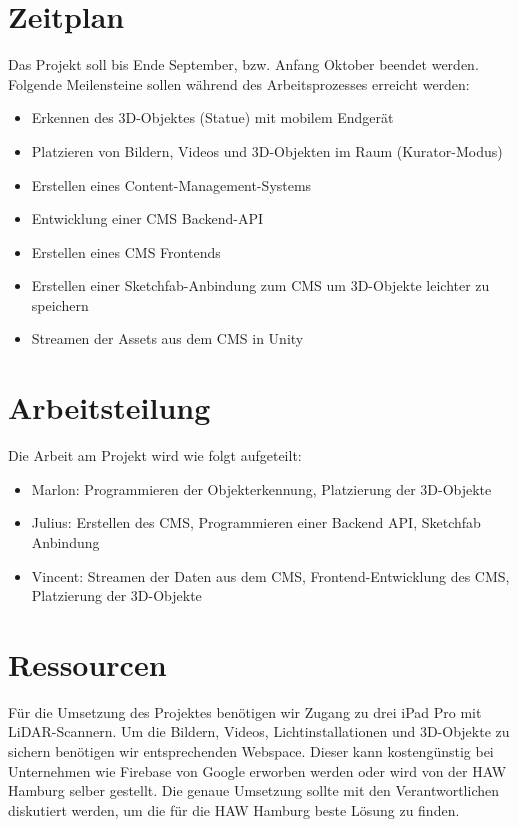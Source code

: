\documentclass[pdftex,10pt,a4paper,oneside]{article}
\numberwithin{equation}{section} %
\begin{document}
\section{Zeitplan}
Das Projekt soll bis Ende September, bzw. Anfang Oktober beendet werden. Folgende Meilensteine sollen während des Arbeitsprozesses erreicht werden:
\begin{itemize}
    \item Erkennen des 3D-Objektes (Statue) mit mobilem Endgerät
    \item Platzieren von Bildern, Videos und 3D-Objekten im Raum (Kurator-Modus)
    \item Erstellen eines Content-Management-Systems
    \item Entwicklung einer CMS Backend-API
    \item Erstellen eines CMS Frontends
    \item Erstellen einer Sketchfab-Anbindung zum CMS um 3D-Objekte leichter zu speichern
    \item Streamen der Assets aus dem CMS in Unity
\end{itemize}
\section{Arbeitsteilung}
Die Arbeit am Projekt wird wie folgt aufgeteilt:
\begin{itemize}
    \item Marlon: Programmieren der Objekterkennung, Platzierung der 3D-Objekte
    \item Julius: Erstellen des CMS, Programmieren einer Backend API, Sketchfab Anbindung
    \item Vincent: Streamen der Daten aus dem CMS, Frontend-Entwicklung des CMS, Platzierung der 3D-Objekte
\end{itemize}
\section{Ressourcen}
Für die Umsetzung des Projektes benötigen wir Zugang zu drei iPad Pro mit LiDAR-Scannern. Um die Bildern, Videos, Lichtinstallationen und 3D-Objekte zu sichern benötigen wir entsprechenden Webspace. Dieser kann kostengünstig bei Unternehmen wie Firebase von Google erworben werden oder wird von der HAW Hamburg selber gestellt. Die genaue Umsetzung sollte mit den Verantwortlichen diskutiert werden, um die für die HAW Hamburg beste Lösung zu finden.
\end{document}
